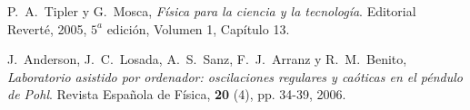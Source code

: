 \documentclass[11pt]{articulo}
\begin{document}

\begin{thebibliography}{X}

P.~A.~Tipler y G.~Mosca,
\textit{F\'isica para la ciencia y la tecnolog\'ia}. 
Editorial Revert\'e, 2005, $5^{a}$ edici\'on, Volumen 1, Cap\'itulo 13.

J.~Anderson, J.~C.~Losada, A.~S.~Sanz, F.~J.~Arranz y R.~M.~Benito,
\textit{Laboratorio asistido por ordenador: oscilaciones regulares y ca\'oticas en el p\'endulo de Pohl}.
Revista Espa\~nola de F\'isica, {\bf 20} (4), pp. 34-39, 2006.

\end{thebibliography}


\end{document}
